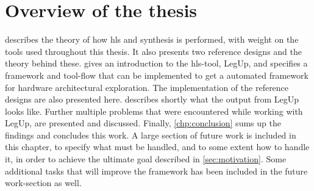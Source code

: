 \section{Overview of the thesis}
 describes the theory of how \gls{hls} and synthesis is performed, with weight on the tools used throughout this thesis. It also presents two reference designs and the theory behind these.  gives an introduction to the \gls{hls}-tool, LegUp, and specifies a framework and tool-flow that can be implemented to get a automated framework for hardware architectural exploration. The implementation of the reference designs are also presented here.  describes shortly what the output from LegUp looks like. Further multiple problems that were encountered while working with LegUp, are presented and discussed. Finally, \cref{chp:conclusion} sums up the findings and concludes this work. A large section of future work is included in this chapter, to specify what must be handled, and to some extent how to handle it, in order to achieve the ultimate goal described in \cref{sec:motivation}. Some additional tasks that will improve the framework has been included in the future work-section as well.